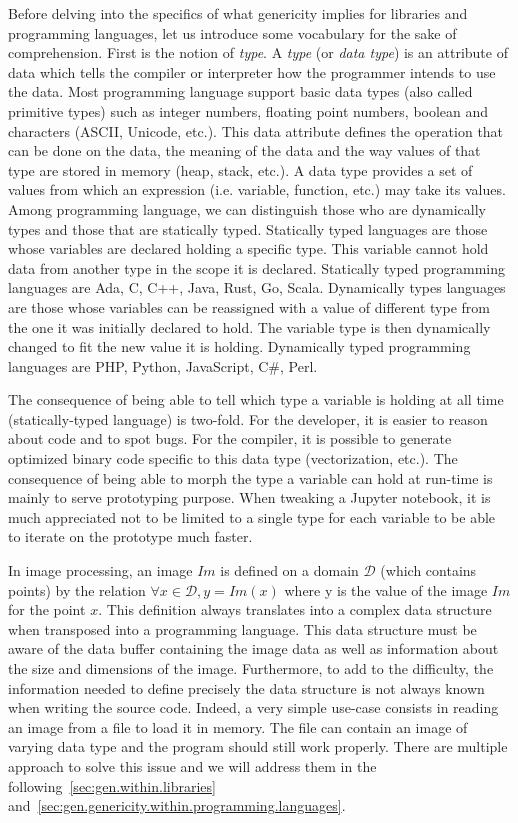 Before delving into the specifics of what genericity implies for libraries and programming languages, let us introduce
some vocabulary for the sake of comprehension. First is the notion of \emph{type}. A \emph{type} (or \emph{data type})
is an attribute of data which tells the compiler or interpreter how the programmer intends to use the data. Most
programming language support basic data types (also called primitive types) such as integer numbers, floating point
numbers, boolean and characters (ASCII, Unicode, etc.). This data attribute defines the operation that can be done on
the data, the meaning of the data and the way values of that type are stored in memory (heap, stack, etc.). A data type
provides a set of values from which an expression (i.e. variable, function, etc.) may take its values. Among programming
language, we can distinguish those who are dynamically types and those that are statically typed. Statically typed
languages are those whose variables are declared holding a specific type. This variable cannot hold data from another
type in the scope it is declared. Statically typed programming languages are Ada, C, C++, Java, Rust, Go, Scala.
Dynamically types languages are those whose variables can be reassigned with a value of different type from the one it
was initially declared to hold. The variable type is then dynamically changed to fit the new value it is holding.
Dynamically typed programming languages are PHP, Python, JavaScript, C\#, Perl.

The consequence of being able to tell which type a variable is holding at all time (statically-typed language) is
two-fold. For the developer, it is easier to reason about code and to spot bugs. For the compiler, it is possible to
generate optimized binary code specific to this data type (vectorization, etc.). The consequence of being able to morph
the type a variable can hold at run-time is mainly to serve prototyping purpose. When tweaking a Jupyter notebook, it is
much appreciated not to be limited to a single type for each variable to be able to iterate on the prototype much faster.

In image processing, an image $Im$ is defined on a domain $\mathcal{D}$ (which contains points) by the relation $\forall
  x \in \mathcal{D}, y = Im(x)$ where y is the value of the image $Im$ for the point $x$. This definition always
translates into a complex data structure when transposed into a programming language. This data structure must be aware
of the data buffer containing the image data as well as information about the size and dimensions of the image.
Furthermore, to add to the difficulty, the information needed to define precisely the data structure is not always known
when writing the source code. Indeed, a very simple use-case consists in reading an image from a file to load it in
memory. The file can contain an image of varying data type and the program should still work properly. There are
multiple approach to solve this issue and we will address them in the following~\cref{sec:gen.within.libraries}
and~\cref{sec:gen.genericity.within.programming.languages}.



